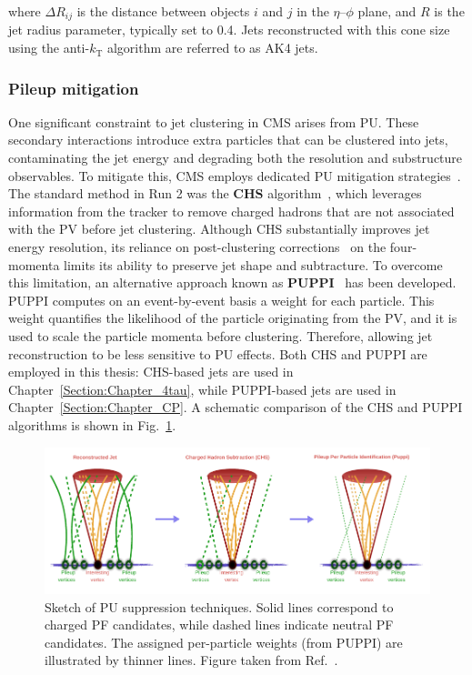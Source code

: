 where $\Delta R_{ij}$ is the distance between objects $i$ and $j$ in the $\eta$–$\phi$ plane, and $R$ is the jet radius parameter, typically set to 0.4. Jets reconstructed with this cone size using the anti-$k_\mathrm{T}$ algorithm are referred to as AK4 jets.

\subsubsection{Pileup mitigation}

One significant constraint to jet clustering in \ac{CMS} arises from \ac{PU}. These secondary interactions introduce extra particles that can be clustered into jets, contaminating the jet energy and degrading both the resolution and substructure observables. To mitigate this, \ac{CMS} employs dedicated \ac{PU} mitigation strategies~\cite{PU_Mitigation}. The standard method in Run 2 was the \textbf{\ac{CHS}} algorithm~\cite{ParticleFlow}, which leverages information from the tracker to remove charged hadrons that are not associated with the \ac{PV} before jet clustering. Although \ac{CHS} substantially improves jet energy resolution, its reliance on post-clustering corrections~\cite{JetEnergyCalibration} on the four-momenta limits its ability to preserve jet shape and subtracture. To overcome this limitation, an alternative approach known as \textbf{\ac{PUPPI}}~\cite{PUPPI} has been developed. \ac{PUPPI} computes on an event-by-event basis a weight for each particle. This weight quantifies the likelihood of the particle originating from the \ac{PV}, and it is used to scale the particle momenta before clustering. Therefore, allowing jet reconstruction to be less sensitive to \ac{PU} effects. Both \ac{CHS} and \ac{PUPPI} are employed in this thesis: \ac{CHS}-based jets are used in Chapter~\ref{Section:Chapter_4tau}, while \ac{PUPPI}-based jets are used in Chapter~\ref{Section:Chapter_CP}. A schematic comparison of the \ac{CHS} and \ac{PUPPI} algorithms is shown in Fig.~\ref{Figure:Chapter4_Pileup_Schematic}.

\begin{figure}[h]
\centering
\includegraphics[width=\textwidth]{Figures/Chapter4/PU_Shematic.pdf}
\caption[Sketch of pileup suppression techniques]{
Sketch of \ac{PU} suppression techniques. Solid lines correspond to charged \ac{PF} candidates, while dashed lines indicate neutral \ac{PF} candidates. The assigned per-particle weights (from \ac{PUPPI}) are illustrated by thinner lines. Figure taken from Ref.~\cite{Jet_Reconstruction_Run2_Run3}.}
\label{Figure:Chapter4_Pileup_Schematic}
\end{figure}

